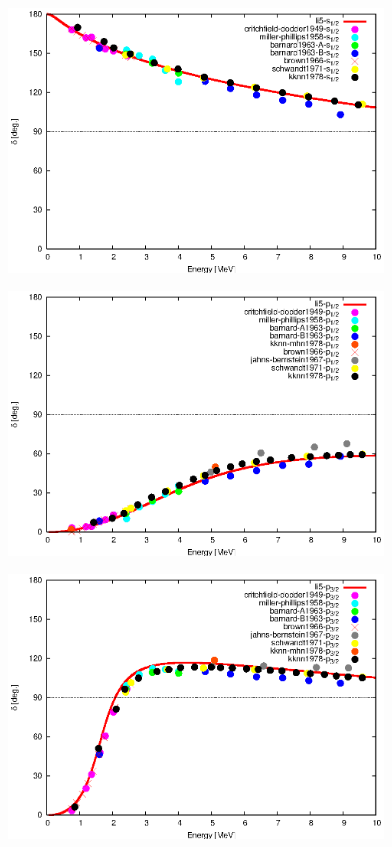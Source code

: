 \documentclass[a4paper,english]{jsarticle}
\begin{document}
\begin{figure}
\centering
\includegraphics[height=7cm,width=10cm]{../li5_phs_exp_com_s1.eps}
\end{figure}
\begin{figure}
\centering
\includegraphics[height=7cm,width=10cm]{../li5_phs_exp_com_p1.eps}
\end{figure}
\begin{figure}
\centering
\includegraphics[height=7cm,width=10cm]{../li5_phs_exp_com_p3.eps}
\end{figure}
\end{document}
